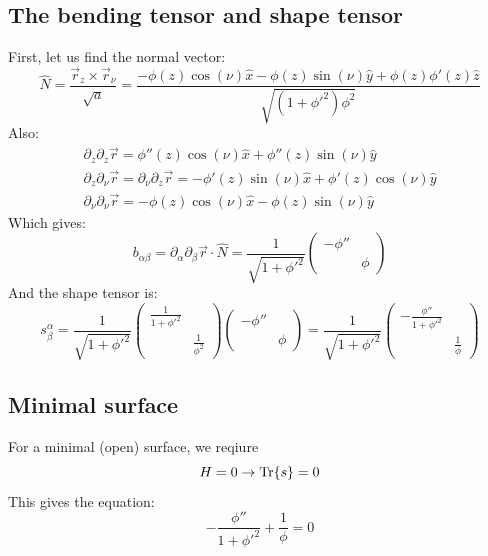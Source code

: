 \documentclass{article}
\begin{document}
\subsection{The bending tensor and shape tensor}
First, let us find the normal vector:
\begin{equation}
    \hat{N} = \frac{\vec{r}_z \times \vec{r}_\nu}{\sqrt{a}} = \frac{-\phi(z)\cos(\nu)\hat{x} - \phi(z)\sin(\nu)\hat{y} + \phi(z)\phi'(z)\hat{z}}{\sqrt{(1 + \phi'^2)\phi^2}}
\end{equation}
Also:
\begin{equation}
\begin{gathered}
    \partial_{z}\partial_{z} \vec{r} = \phi''(z)\cos(\nu)\hat{x} + \phi''(z)\sin(\nu)\hat{y}
    \\
    \partial_{z}\partial_{\nu} \vec{r} = \partial_{\nu}\partial_{z} \vec{r} = -\phi'(z)\sin(\nu)\hat{x} + \phi'(z)\cos(\nu)\hat{y}
    \\
    \partial_{\nu}\partial_{\nu} \vec{r} = -\phi(z)\cos(\nu)\hat{x} - \phi(z)\sin(\nu)\hat{y}
\end{gathered}
\end{equation}
Which gives:
\begin{equation}
    \boxed{
        b_{\alpha\beta} = \partial_\alpha\partial_\beta \vec{r}\cdot\hat{N} =
        \frac{1}{\sqrt{1 + \phi'^2}}
        \begin{pmatrix}
            -\phi'' & \\ & \phi
        \end{pmatrix}
    }
\end{equation}
And the shape tensor is:
\begin{equation}
    s^\alpha_\beta =
    \frac{1}{\sqrt{1 + \phi'^2}}
    \begin{pmatrix}
        \frac{1}{1 + \phi'^2} & \\ & \frac{1}{\phi^2}
    \end{pmatrix}
    \begin{pmatrix}
        -\phi'' & \\ & \phi
    \end{pmatrix} =
    \boxed{\frac{1}{\sqrt{1 + \phi'^2}}
    \begin{pmatrix}
        -\frac{\phi''}{1 + \phi'^2} & \\ & \frac{1}{\phi}
    \end{pmatrix}}
\end{equation}
\subsection{Minimal surface}
For a minimal (open) surface, we reqiure
\begin{equation}
    H = 0 \rightarrow \Tr{s} = 0
\end{equation}
This gives the equation:
\begin{equation}
    \boxed{-\frac{\phi''}{1 + \phi'^2} + \frac{1}{\phi} = 0}
\end{equation}
\end{document}
